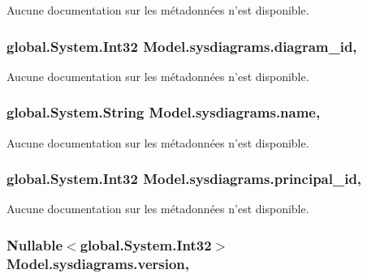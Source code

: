 Aucune documentation sur les métadonnées n'est disponible. 

\hypertarget{class_model_1_1sysdiagrams_a9ce7be08043952209a0b1fce62fe0d86}{
\subsubsection[{diagram\-\_\-id}]{\setlength{\rightskip}{0pt plus 5cm}global.\-System.\-Int32 Model.\-sysdiagrams.\-diagram\-\_\-id\hspace{0.3cm}{\ttfamily [get]}, {\ttfamily [set]}}}\label{class_model_1_1sysdiagrams_a9ce7be08043952209a0b1fce62fe0d86}


Aucune documentation sur les métadonnées n'est disponible. 

\hypertarget{class_model_1_1sysdiagrams_a7b2a5e745f15a3fde21f58e57786c2a0}{
\subsubsection[{name}]{\setlength{\rightskip}{0pt plus 5cm}global.\-System.\-String Model.\-sysdiagrams.\-name\hspace{0.3cm}{\ttfamily [get]}, {\ttfamily [set]}}}\label{class_model_1_1sysdiagrams_a7b2a5e745f15a3fde21f58e57786c2a0}


Aucune documentation sur les métadonnées n'est disponible. 

\hypertarget{class_model_1_1sysdiagrams_ae438ae2c8f6f3fa8f1a52aeabdba5efd}{
\subsubsection[{principal\-\_\-id}]{\setlength{\rightskip}{0pt plus 5cm}global.\-System.\-Int32 Model.\-sysdiagrams.\-principal\-\_\-id\hspace{0.3cm}{\ttfamily [get]}, {\ttfamily [set]}}}\label{class_model_1_1sysdiagrams_ae438ae2c8f6f3fa8f1a52aeabdba5efd}


Aucune documentation sur les métadonnées n'est disponible. 

\hypertarget{class_model_1_1sysdiagrams_a173f1f695fb8a41ddbb2b1591650fd59}{
\subsubsection[{version}]{\setlength{\rightskip}{0pt plus 5cm}Nullable$<$global.\-System.\-Int32$>$ Model.\-sysdiagrams.\-version\hspace{0.3cm}{\ttfamily [get]}, {\ttfamily [set]}}}\label{class_model_1_1sysdiagrams_a173f1f695fb8a41ddbb2b1591650fd59}


